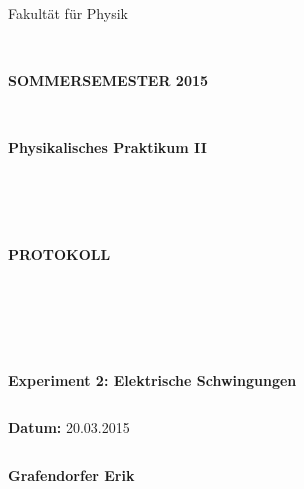 \documentclass{article}
\begin{document}
\thispagestyle{empty}
			\begin{center}
			\Large{Fakultät für Physik}\\
			\end{center}
\begin{verbatim}


\end{verbatim}
			\begin{center}
			\textbf{\LARGE SOMMERSEMESTER 2015}
			\end{center}
\begin{verbatim}


\end{verbatim}
			\begin{center}
			\textbf{\LARGE{Physikalisches Praktikum II}}
			\end{center}
\begin{verbatim}




\end{verbatim}

			\begin{center}
			\textbf{\LARGE{PROTOKOLL}}
			\end{center}
			
\begin{verbatim}





\end{verbatim}

			\begin{flushleft}
			\textbf{\Large{Experiment 2: Elektrische Schwingungen}}\\
			\LARGE{}	
			\end{flushleft}

\begin{verbatim}

\end{verbatim}	
			\begin{flushleft}
			\textbf{\Large{Datum:}} \Large{20.03.2015}
			\end{flushleft}
			
\begin{verbatim}
\end{verbatim}
		\begin{flushleft}
			\textbf{\Large{Grafendorfer Erik}} 
			\end{flushleft}
\end{document}
